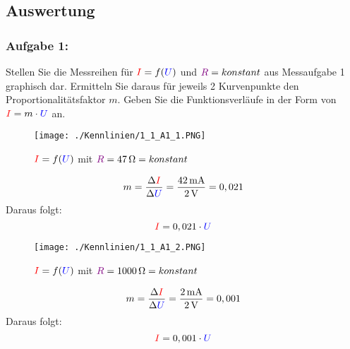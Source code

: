 \documentclass[a4paper,titlepage,parskip]{scrreprt}
\newcommand{\spannung}[1]{\textcolor{blue}{#1}}
\newcommand{\strom}[1]{\textcolor{red}{#1}}
\newcommand{\widerstand}[1]{\textcolor{violet}{#1}}
\begin{document}
        \subsection{Auswertung}
          \subsubsection{Aufgabe 1:} Stellen Sie die Messreihen für $\strom{I} = f(\spannung{U})$ und $\widerstand{R} = konstant$  aus Messaufgabe 1 graphisch dar. Ermitteln Sie daraus für jeweils 2 Kurvenpunkte den Proportionalitätsfaktor $m$. Geben Sie die Funktionsverläufe in der Form von $\strom{I} = m \cdot \spannung{U}$ an.
		   \pagebreak           
           \begin{figure}[!htbp]
              \begin{center}
                  \texttt{[image: ./Kennlinien/1\_1\_A1\_1.PNG]}
                \end{center}
                \caption{$\strom{I} = f(\spannung{U})$ mit $\widerstand{R} = \SI{47}{\ohm} = konstant$}
                \label{fig:1_1_A1}
            \end{figure}
            
            \begin{equation*}
            	m = \frac{\Delta \strom{I}}{\Delta \spannung{U}} = \frac{\SI{42}{\milli\ampere}}{\SI{2}{\volt}} = 0,021
            \end{equation*}
            Daraus folgt:
            \begin{equation*}
            	\strom{I} = 0,021 \cdot \spannung{U}
            \end{equation*}
            
            \pagebreak
            \begin{figure}[!htbp]
              \begin{center}
                  \texttt{[image: ./Kennlinien/1\_1\_A1\_2.PNG]}
                \end{center}
                \caption{$\strom{I} = f(\spannung{U})$ mit $\widerstand{R} = \SI{1000}{\ohm} = konstant$}
                \label{fig:1_1_A1}
            \end{figure}
            
            \begin{equation*}
            	m = \frac{\Delta \strom{I}}{\Delta \spannung{U}} = \frac{\SI{2}{\milli\ampere}}{\SI{2}{\volt}} = 0,001
            \end{equation*}
            Daraus folgt:
            \begin{equation*}
            	\strom{I} = 0,001 \cdot \spannung{U}
            \end{equation*}
          
\end{document}
